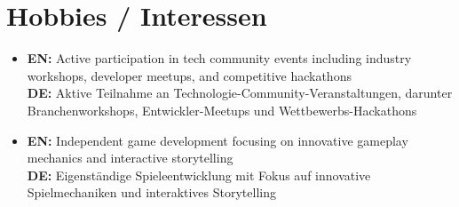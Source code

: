 \documentclass[11pt,a4paper]{article}
\begin{document}
\section*{Hobbies / Interessen}
\begin{itemize}[leftmargin=*, itemsep=0.6em]
    \item \textbf{EN:} Active participation in tech community events including industry workshops, developer meetups, and competitive hackathons\\
    \textbf{DE:} Aktive Teilnahme an Technologie-Community-Veranstaltungen, darunter Branchenworkshops, Entwickler-Meetups und Wettbewerbs-Hackathons
    \item \textbf{EN:} Independent game development focusing on innovative gameplay mechanics and interactive storytelling\\
    \textbf{DE:} Eigenständige Spieleentwicklung mit Fokus auf innovative Spielmechaniken und interaktives Storytelling
\end{itemize}
\end{document}
